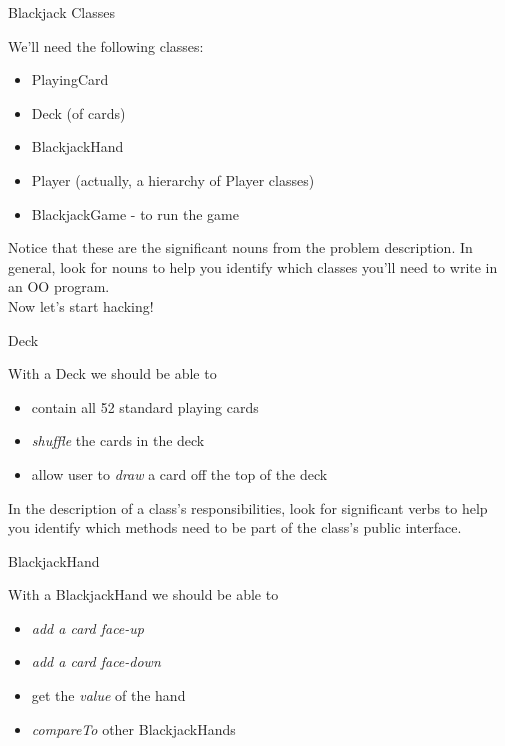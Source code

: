 \documentclass{beamer}
\begin{document}
\begin{frame}[fragile]{Blackjack Classes}


We'll need the following classes:
\begin{itemize}
\item PlayingCard
\item Deck (of cards)
\item BlackjackHand
\item Player (actually, a hierarchy of Player classes) 
\item BlackjackGame - to run the game
\end{itemize}

Notice that these are the significant nouns from the problem description.  In general, look for nouns to help you identify which classes you'll need to write in an OO program.\\
\vspace{.1in}
Now let's start hacking!

\end{frame}

\begin{frame}[fragile]{Deck}


With a Deck we should be able to
\begin{itemize}
\item contain all 52 standard playing cards
\item {\it shuffle} the cards in the deck
\item allow user to {\it draw} a card off the top of the deck
\end{itemize}

In the description of a class's responsibilities, look for significant verbs to help you identify which methods need to be part of the class's public interface.

\end{frame}

\begin{frame}[fragile]{BlackjackHand}


With a BlackjackHand we should be able to
\begin{itemize}
\item {\it add a card face-up}
\item {\it add a card face-down}
\item get the {\it value} of the hand
\item {\it compareTo} other BlackjackHands
\end{itemize}


\end{frame}
\end{document}
